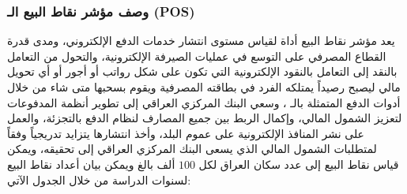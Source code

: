\documentclass[10pt,a4paper]{report}
\begin{document}
\begin{doublespacing}
\subsubsection{وصف مؤشر نقاط البيع الـ (POS)}
يعد مؤشر نقاط البيع أداة لقياس مستوى انتشار خدمات الدفع الإلكتروني، ومدى قدرة القطاع المصرفي على التوسع في عمليات الصيرفة الإلكترونية، والتحول من التعامل بالنقد إلى التعامل بالنقود الإلكترونية التي تكون على شكل رواتب أو أجور أو أي تحويل مالي ليصبح رصيداً يمتلكه الفرد في بطاقته المصرفية ويقوم بسحبها متى شاء من خلال أدوات الدفع المتمثلة بالـ ، وسعي البنك المركزي العراقي إلى تطوير أنظمة المدفوعات لتعزيز الشمول المالي، وإكمال الربط بين جميع المصارف لنظام الدفع بالتجزئة، والعمل على نشر المنافذ الإلكترونية على عموم البلد، وأخذ انتشارها يتزايد تدريجياً وفقاً لمتطلبات الشمول المالي الذي يسعى البنك المركزي العراقي إلى تحقيقه، ويمكن قياس نقاط البيع إلى عدد سكان العراق لكل \( 100 \) ألف بالغ ويمكن بيان أعداد نقاط البيع لسنوات الدراسة من خلال الجدول الآتي:
\begin{table}[H]
	\captionsetup{font=Large}  %
	\fontsize{14}{12}\selectfont
	\centering
	\caption{عدد نقاط البيع POS للقطاع المصرفية المصرفي العراقي للفترة (2021-2010)}
	\label{tab:3.3}
\end{table}
\end{doublespacing}
\end{document}
